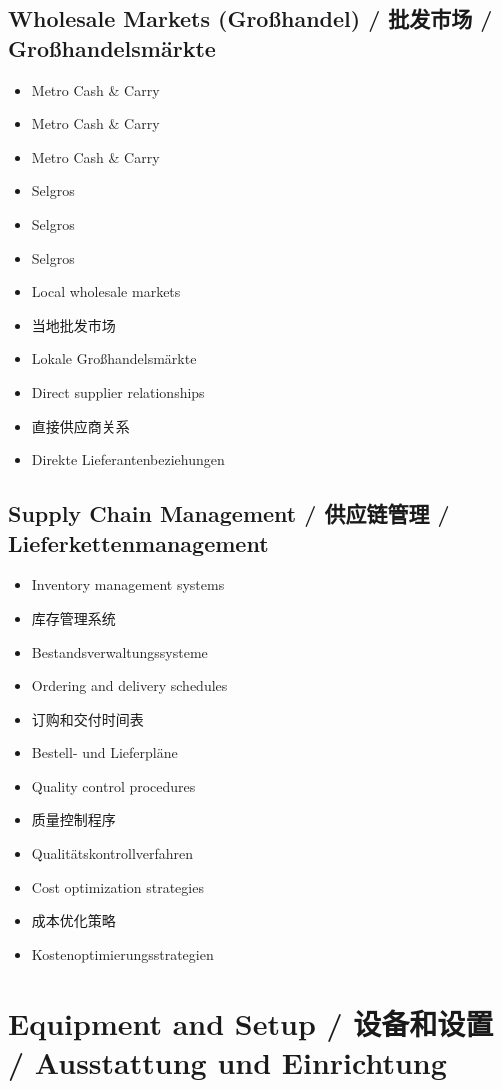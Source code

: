 \subsection{Wholesale Markets (Großhandel) / 批发市场 / Großhandelsmärkte}
\begin{itemize}
    \item Metro Cash \& Carry
    \item Metro Cash \& Carry
    \item Metro Cash \& Carry
    \item Selgros
    \item Selgros
    \item Selgros
    \item Local wholesale markets
    \item 当地批发市场
    \item Lokale Großhandelsmärkte
    \item Direct supplier relationships
    \item 直接供应商关系
    \item Direkte Lieferantenbeziehungen
\end{itemize}

\subsection{Supply Chain Management / 供应链管理 / Lieferkettenmanagement}
\begin{itemize}
    \item Inventory management systems
    \item 库存管理系统
    \item Bestandsverwaltungssysteme
    \item Ordering and delivery schedules
    \item 订购和交付时间表
    \item Bestell- und Lieferpläne
    \item Quality control procedures
    \item 质量控制程序
    \item Qualitätskontrollverfahren
    \item Cost optimization strategies
    \item 成本优化策略
    \item Kostenoptimierungsstrategien
\end{itemize}

\section{Equipment and Setup / 设备和设置 / Ausstattung und Einrichtung}

